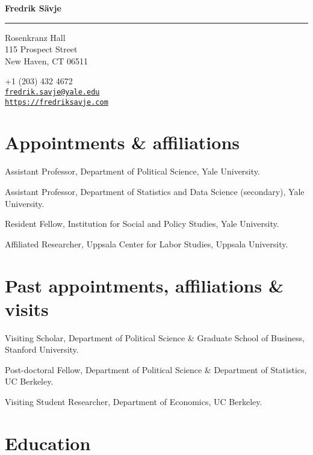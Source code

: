 \documentclass[10pt,letterpaper]{article}
\newenvironment{datelist}{
	\begin{list}{}{
		\setlength{\parskip}{0pt}
		\setlength{\itemsep}{4pt}
		\setlength{\parsep}{0.3em}
		\setlength{\leftmargin}{5.85em}
		\setlength{\labelwidth}{5.85em}
		\setlength{\labelsep}{1.5em}
		}
	}{
\end{list}
}
\newcommand{\dateitem}[2][]{\item[{#1}] {#2}}
\newenvironment{infolist}{
	\begin{list}{}{
		\setlength{\parskip}{0pt}
		\setlength{\itemsep}{4pt}
		\setlength{\parsep}{0.3em}
		\setlength{\leftmargin}{0em}
		\setlength{\labelwidth}{0em}
		}
	}{
\end{list}
}
\newcommand{\infoitem}[1]{\item {#1}}
\begin{document}
	{\huge \bf Fredrik Sävje}

	\rule{\textwidth}{1pt}

	\bigskip


	\begin{minipage}[t]{0.495\textwidth}
		Rosenkranz Hall \\
		115 Prospect Street \\
		New Haven, CT 06511
	\end{minipage}
	\begin{minipage}[t]{0.495\textwidth}
		+1 (203) 432 4672 \\
		\href{mailto:fredrik.savje@yale.edu}{\texttt{fredrik.savje@yale.edu}} \\
		\href{https://fredriksavje.com}{\texttt{https://fredriksavje.com}}
	\end{minipage}

	\vspace{0.3in}


	\section*{Appointments \& affiliations}

	\begin{infolist}
		\infoitem{Assistant Professor, Department of Political Science, Yale University.}
		\infoitem{Assistant Professor, Department of Statistics and Data Science (secondary), Yale University.}
		\infoitem{Resident Fellow, Institution for Social and Policy Studies, Yale University.}
		\infoitem{Affiliated Researcher, Uppsala Center for Labor Studies, Uppsala University.}
	\end{infolist}


	\section*{Past appointments, affiliations \& visits}

	\begin{datelist}
		\dateitem[2019--2020]{Visiting Scholar, Department of Political Science \& Graduate School of Business, Stanford University.}
		\dateitem[2015--2017]{Post-doctoral Fellow, Department of Political Science \& Department of Statistics, UC Berkeley.}
		\dateitem[2013--2014]{Visiting Student Researcher, Department of Economics, UC Berkeley.}
	\end{datelist}


	\section*{Education}
\end{document}
